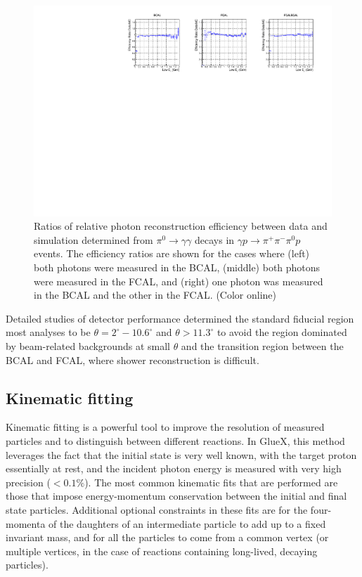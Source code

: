 \begin{figure}[tbp]
\begin{center}
\includegraphics[width=\textwidth]{figures/plot_CostheEff_NIM_jun19.pdf}
\caption{\label{fig:bcalpi0photoneff}
Ratios of relative photon reconstruction efficiency between data and simulation determined from $\pi^0\to\gamma \gamma$ decays in $\gamma p \to  \pi^+\pi^-\pi^0 p$ events.  The efficiency ratios are shown for the cases where (left) both photons were measured in the BCAL, (middle) both photons were measured in the FCAL, and (right) one photon was measured in the BCAL and the other in the FCAL.
 (Color online)}
\end{center}
\end{figure}


Detailed studies of detector performance determined the standard fiducial region most analyses to be $\theta = 2^\circ - 10.6^\circ$ and $\theta > 11.3^\circ$ to avoid the region dominated by beam-related backgrounds at small $\theta$ and the transition region between the BCAL and FCAL, where shower reconstruction is difficult.

\subsection{Kinematic fitting \label{sec:perffitting}}

Kinematic fitting is a powerful tool to improve the resolution of measured particles and to distinguish between different reactions.  In GlueX, this method leverages the fact that the initial state is very well known, with the target proton essentially at rest, and the incident photon energy is measured with very high precision ($<0.1\%$).  The most common kinematic fits that are performed are those that impose energy-momentum conservation between the initial and final state particles.  Additional optional constraints in these fits are for the four-momenta of the daughters of an intermediate particle to add up to a fixed invariant mass, and for all the particles to come from a common vertex (or multiple vertices, in the case of reactions containing long-lived, decaying particles).

